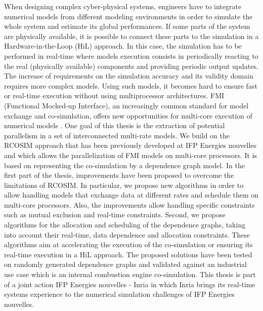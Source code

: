 When designing complex cyber-physical systems, engineers have to integrate numerical models
from different
modeling environments in order to simulate the whole system and estimate its global
performances. If some parts of the system are physically available, it is possible to connect these
parts to the simulation in a Hardware-in-the-Loop (HiL) approach. In this case, the
simulation has to be performed in real-time where models execution consists in periodically
reacting to the real (physically available) components and providing periodic output updates. The
increase of requirements on the simulation accuracy and its validity domain requires more
complex models. Using such models, it becomes hard to ensure fast or real-time execution without using
multiprocessor architectures. FMI (Functional Mocked-up Interface), an increasingly common
standard for model exchange and co-simulation, offers
new opportunities for multi-core execution
of numerical models%
. One goal of this thesis is the extraction of potential parallelism in a set of interconnected multi-rate models. We build on the RCOSIM approach that has been previously developed at IFP Energies nouvelles and which allows the parallelization of FMI models on multi-core processors. It is based on representing the co-simulation by a dependence graph model. In the first part of the thesis, improvements have been proposed to overcome the limitations of RCOSIM. In particular, we propose new algorithms in order to allow
handling models that exchange data at different
rates and schedule them on multi-core processors. Also, the improvements allow handling specific constraints such as mutual exclusion and real-time constraints. 
Second, we propose algorithms for the allocation and scheduling of the dependence graphs, taking %
into account their real-time, data dependence and allocation constraints. These algorithms aim at accelerating the execution of the co-simulation or ensuring its real-time execution in a HiL approach.
The proposed solutions have been tested on randomly generated dependence graphs and validated against an industrial use case which is an internal combustion engine co-simulation.
This thesis is part of a joint action IFP Energies nouvelles - Inria in which Inria brings its real-time systems experience to the numerical simulation challenges of IFP Energies nouvelles.
